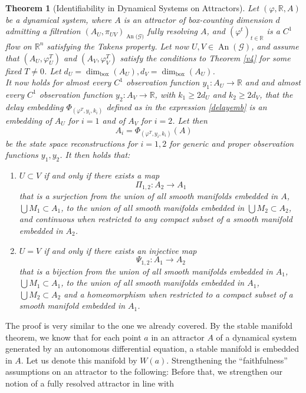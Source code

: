 \documentclass[11pt, a4paper]{memoir}
\theoremstyle{break}
\newtheorem{thm}{Theorem}
\theoremstyle{break}
\theoremstyle{nonumberplain}
\newcommand{\mR}{\mathbb{R}}
\DeclareMathOperator{\an}{An}
\begin{document}
\begin{thm}[Identifiability in Dynamical Systems on Attractors]
Let $(\varphi, \mR,A)$ be a dynamical system, where $A$ is an attractor of box-counting dimension $d$ admitting a filtration $(A_U,\pi_{UV})_{\an(\mathcal{G)}}$ fully resolving $A$, and $(\varphi^t)_{t\in \mR}$ is a $C^1$ flow on $\mR^n$ satisfying the Takens property. Let now $U,V\in\an( \mathcal{G})$, and assume that $(A_U,\varphi_U^T)$ and $(A_V,\varphi_V^T)$ satisfy the conditions to Theorem \ref{v4} for some fixed $T\neq 0$. Let $d_U=\dim_{\text{box}}(A_U), d_V=\dim_{\text{box}}(A_U)$.\\
It now holds for almost every $C^1$ observation function $y_1:A_U\to\mR$ and and almost every $C^1$ observation function $y_2:A_V\to \mR$, with $k_1\geqslant 2d_U$ and $k_2\geqslant 2d_V$, that the delay embedding $\Phi_{(\varphi^T,y_i,k_i)}$ defined as in the expression \ref{delayemb} is an embedding of $A_U$ for $i=1$ and of $A_V$ for $i=2$. Let then 
$$A_i=\Phi_{(\varphi^T,y_i,k_i)}(A)$$ 
be the state space reconstructions for $i=1,2$ for generic and proper observation functions $y_1,y_2$. It then holds that:
\begin{enumerate}[label=\roman*.]
	\item $U\subset V$ if and only if there exists a map
	$$\Pi_{1,2}:A_2\to A_1$$ 
	that is a surjection from the union of all smooth manifolds embedded in $A$, $\bigcup M_1\subset A_1$, to the union of all smooth manifolds embedded in $\bigcup M_2\subset A_2$, and continuous when restricted to any compact subset of a smooth manifold embedded in $A_2$.
	\item $U=V$ if and only if there exists  an injective map
	$$\Psi_{1,2}:A_1\to A_2$$
	that is a bijection from the union of all smooth manifolds embedded in $A_1$, $\bigcup M_1\subset A_1$, to the union of all smooth manifolds embedded in $A_1$, $\bigcup M_2\subset A_2$ and a homeomorphism when restricted to a compact subset of a smooth manifold embedded in $A_1$.
\end{enumerate}
\end{thm}
The proof is very similar to the one we already covered. By the stable manifold theorem, we know that for each point $a$ in an attractor $A$ of a dynamical system generated by an autonomous differential equation, a stable manifold is embedded in $A$. Let us denote this manifold by $W(a)$. Strengthening the \enquote{faithfulness} assumptions on an attractor to the following:
Before that, we strengthen our notion of a fully resolved attractor in line with \cite{mathFound}
\end{document}
